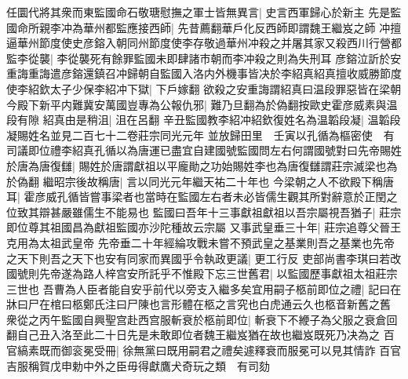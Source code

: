 任圜代將其衆而東監國命石敬瑭慰撫之軍士皆無異言|{
	史言西軍歸心於新主}
先是監國命所親李冲為華州都監應接西師|{
	先昔薦翻華戶化反西師即謂魏王繼岌之師}
冲擅逼華州節度使史彦鎔入朝同州節度使李存敬過華州冲殺之并屠其家又殺西川行營都監李從襲|{
	李從襲死有餘罪監國未即肆諸市朝而李冲殺之則為失刑耳}
彦鎔泣訢於安重誨重誨遣彦鎔還鎮召冲歸朝自監國入洛内外機事皆决於李紹真紹真擅收威勝節度使李紹欽太子少保李紹冲下獄|{
	下戶嫁翻}
欲殺之安重誨謂紹真曰温段罪惡皆在梁朝今殿下新平内難冀安萬國豈專為公報仇邪|{
	難乃旦翻為於偽翻按歐史霍彦威素與温段有隙}
紹真由是稍沮|{
	沮在呂翻}
辛丑監國教李紹冲紹欽復姓名為温韜段凝|{
	温韜段凝賜姓名並見二百七十二卷莊宗同光元年}
並放歸田里　壬寅以孔循為樞密使　有司議即位禮李紹真孔循以為唐運已盡宜自建國號監國問左右何謂國號對曰先帝賜姓於唐為唐復讎|{
	賜姓於唐謂獻祖以平龐勛之功始賜姓李也為唐復讎謂莊宗滅梁也為於偽翻}
繼昭宗後故稱唐|{
	言以同光元年繼天祐二十年也}
今梁朝之人不欲殿下稱唐耳|{
	霍彦威孔循皆嘗事梁者也當時在監國左右者未必皆儒生觀其所對辭意於正閏之位致其辯甚嚴雖儒生不能易也}
監國曰吾年十三事獻祖獻祖以吾宗屬視吾猶子|{
	莊宗即位尊其祖國昌為獻祖監國亦沙陀種故云宗屬}
又事武皇垂三十年|{
	莊宗追尊父晉王克用為太祖武皇帝}
先帝垂二十年經綸攻戰未嘗不預武皇之基業則吾之基業也先帝之天下則吾之天下也安有同家而異國乎令執政更議|{
	更工行反}
吏部尚書李琪曰若改國號則先帝遂為路人梓宫安所託乎不惟殿下忘三世舊君|{
	以監國歷事獻祖太祖莊宗三世也}
吾曹為人臣者能自安乎前代以旁支入繼多矣宜用嗣子柩前即位之禮|{
	記曰在牀曰尸在棺曰柩鄭氏注曰尸陳也言形體在柩之言究也白虎通云久也柩音新舊之舊}
衆從之丙午監國自興聖宫赴西宫服斬衰於柩前即位|{
	斬衰下不緶子為父服之衰倉回翻自己丑入洛至此二十日先是未敢即位者魏王繼岌猶在故也繼岌既死乃决為之}
百官縞素既而御衮冕受冊|{
	徐無黨曰既用嗣君之禮矣遽釋衰而服冕可以見其情詐}
百官吉服稱賀戊申勅中外之臣毋得獻鷹犬奇玩之類　有司劾

